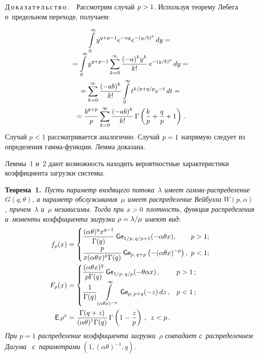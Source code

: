 \begin{multicols}{2}
\noindent
Д\,о\,к\,а\,з\,а\,т\,е\,л\,ь\,с\,т\,в\,о\,.\ \ 
Рассмотрим случай $p\hm>1$. Используя теорему Лебега о~предельном переходе, получаем:

\noindent
\begin{multline*}
\int\limits_0^{\infty}y^{q+p-1}e^{-ay}e^{-(y/b)^p} \,dy = {}\\[-5pt]
{}=
\int\limits_0^{\infty} y^{q+p-1}\sum\limits_{k=0}^\infty \displaystyle\frac{\displaystyle (-a)^k y^k\mathstrut}{\displaystyle k!\mathstrut}\,
 e^{-(y/b)^p} \, dy ={}\\
{}=\sum\limits_{k=0}^\infty 
\displaystyle\frac{\displaystyle (-ab)^k \mathstrut}{\displaystyle k!\mathstrut}\int\limits_0^{\infty} t^{k/p+q/p} e^{-t} \,dt= {}\\
{}=
\displaystyle\frac{\displaystyle b^{q+p}\mathstrut}{\displaystyle p\mathstrut}\sum\limits_{k=0}^\infty \displaystyle\frac{\displaystyle (-ab)^k\mathstrut}{\displaystyle k!\mathstrut}\, \Gamma\left(\displaystyle\frac{\displaystyle k\mathstrut}{\displaystyle p\mathstrut}+\displaystyle\frac{\displaystyle q\mathstrut}{\displaystyle p\mathstrut}+1\right)\,.
\end{multline*}
Случай $p<1$ рассматривается аналогично. Случай $p\hm=1$ напрямую следует 
из определения гам\-ма-функ\-ции.
Лемма доказана.

\smallskip

Леммы~1 и~2 дают возможность находить вероятностные характеристики коэффициента 
загрузки системы.

\smallskip

\noindent
\textbf{Теорема~1.}\
\textit{Пусть параметр входящего потока~$\lambda$ имеет гам\-ма-рас\-пре\-де\-ле\-ние 
$G(q, \theta)$, а параметр обслуживания~$\mu$ имеет распределение 
Вейбулла $W(p,\alpha)$, причем~$\lambda$ и~$\mu$ независимы. Тогда при $x\hm>0$ 
плотность, 
функция распределения и~моменты коэффициента загрузки $\rho\hm=\lambda/\mu$ имеют вид}:
\begin{align*}%
f_{\rho}(x) &=
 \begin{cases}
  \fr{(\alpha \theta)^q x^{q-1}}{\Gamma(q)}\,
  {\sf Ge}_{1/p,\, q/p+1} (-\alpha \theta x), &\!\!\!p > 1;\\
   \fr{p}{x(\alpha \theta x)^{p}\Gamma(q)}\,{\sf Ge}_{p,\, q+p} 
   \left(-(\alpha \theta x)^{-p}\right), &\!\!\!p < 1;
 \end{cases}
\\
F_\rho(x) &=
 \begin{cases}
   \fr{(\alpha \theta x)^q }{p\Gamma(q)}\, {\sf Ge}_{1/p,\, q/p} 
   (-\theta \alpha x)\,, &p > 1\,;\\
  \fr{1}{\Gamma(q)}\int\limits_{(\alpha \theta x)^{-p}}^{\infty} 
  {\sf Ge}_{p,\, p+q}(-z) \,dz\,, &p < 1\,;
 \end{cases}
\\
{\sf E}\,\rho^z &= \fr{\Gamma(q+z)}{(\alpha\theta)^z\Gamma(q)}\,
 \Gamma\left(1-\fr{z}{p}\right)\,, \enskip z<p\,.
 \end{align*}
\textit{При $p=1$ распределение коэффициента загрузки~$\rho$ 
совпадает с~распределением Дагума}~\cite{Dagum1977} \textit{с~параметрами} 
$(1,(\alpha\theta)^{-1},q)$.



\end{multicols}
